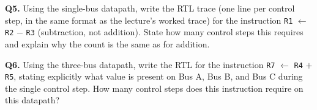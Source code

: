 \documentclass[11pt]{article}
\begin{document}
\textbf{Q5.} Using the single-bus datapath, write the RTL trace (one line per control step, in the same format as the lecture's worked trace) for the instruction \texttt{R1} $\gets$ \texttt{R2} $-$ \texttt{R3} (subtraction, not addition). State how many control steps this requires and explain why the count is the same as for addition.

\textbf{Q6.} Using the three-bus datapath, write the RTL for the instruction \texttt{R7} $\gets$ \texttt{R4} $+$ \texttt{R5}, stating explicitly what value is present on Bus A, Bus B, and Bus C during the single control step. How many control steps does this instruction require on this datapath?
\end{document}
